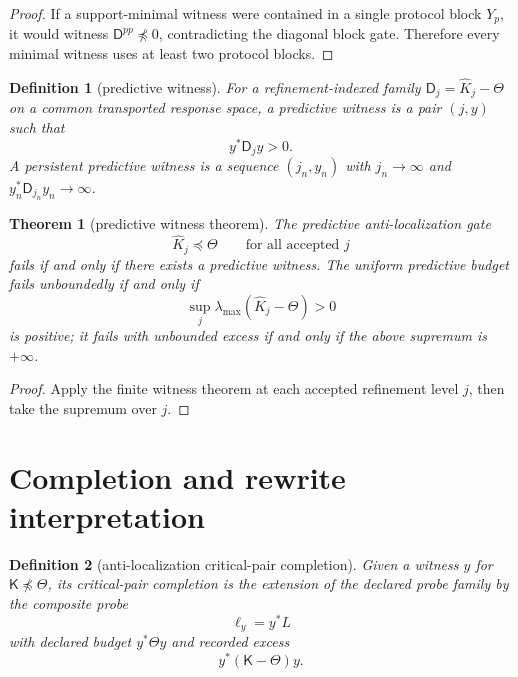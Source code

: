 \documentclass[11pt]{article}
\newtheorem{theorem}{Theorem}
\newtheorem{definition}{Definition}
\newcommand{\K}{\mathsf K}
\newcommand{\Def}{\mathsf D}
\begin{document}
\begin{proof}
If a support-minimal witness were contained in a single protocol block $Y_p$, it would witness $\Def^{pp}\npreceq0$, contradicting the diagonal block gate.  Therefore every minimal witness uses at least two protocol blocks.
\end{proof}

\begin{definition}[predictive witness]
For a refinement-indexed family $\Def_j=\widehat K_j-\Theta$ on a common transported response space, a predictive witness is a pair $(j,y)$ such that
\[
  y^*\Def_jy>0 .
\]
A persistent predictive witness is a sequence $(j_n,y_n)$ with $j_n\to\infty$ and $y_n^*\Def_{j_n}y_n\to\infty$.
\end{definition}

\begin{theorem}[predictive witness theorem]
The predictive anti-localization gate
\[
  \widehat K_j\preceq\Theta\qquad\text{for all accepted }j
\]
fails if and only if there exists a predictive witness.  The uniform predictive budget fails unboundedly if and only if
\[
  \sup_j\lambda_{\max}(\widehat K_j-\Theta)>0
\]
is positive; it fails with unbounded excess if and only if the above supremum is $+\infty$.
\end{theorem}

\begin{proof}
Apply the finite witness theorem at each accepted refinement level $j$, then take the supremum over $j$.
\end{proof}

\section{Completion and rewrite interpretation}

\begin{definition}[anti-localization critical-pair completion]
Given a witness $y$ for $\K\npreceq\Theta$, its critical-pair completion is the extension of the declared probe family by the composite probe
\[
  \ell_y=y^*L
\]
with declared budget $y^*\Theta y$ and recorded excess
\[
  y^*(\K-\Theta)y.
\]
\end{definition}
\end{document}
